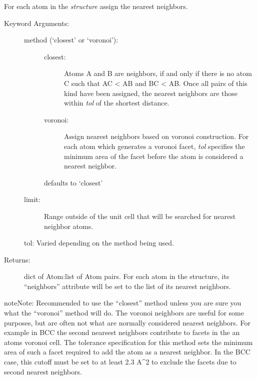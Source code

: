 \documentclass[letterpaper,10pt,english]{sphinxmanual}
\begin{document}
\begin{fulllineitems}
\label{models:qmpy.analysis.nearest_neighbors.find_nearest_neighbors}
For each atom in the \emph{structure} assign the nearest neighbors.
\begin{description}
\item[{Keyword Arguments:}] \leavevmode\begin{description}
\item[{method (`closest' or `voronoi'):}] \leavevmode\begin{description}
\item[{closest: }] \leavevmode
Atoms A and B are neighbors, if and only if there is no atom C 
such that AC \textless{} AB and BC \textless{} AB. Once all pairs of this kind 
have been assigned, the nearest neighbors are those within 
\emph{tol} of the shortest distance.

\item[{voronoi: }] \leavevmode
Assign nearest neighbors based on voronoi construction.
For each atom which generates a voronoi facet, \emph{tol} specifies
the minimum area of the facet before the atom is considered a
nearest neighbor.

\end{description}

defaults to `closest'

\item[{limit:}] \leavevmode
Range outside of the unit cell that will be searched for nearest
neighbor atoms.

\end{description}

tol: Varied depending on the method being used.

\item[{Returns:}] \leavevmode
dict of Atom:list of Atom pairs. For each atom in the structure, its
``neighbors'' attribute will be set to the list of its nearest neighbors.

\end{description}

\begin{notice}{note}{Note:}
Recommended to use the ``closest'' method unless you are sure you
what the ``voronoi'' method will do. The voronoi neighbors are
useful for some purposes, but are often not what are normally
considered nearest neighbors. For example in BCC the second
nearsest neighbors contribute to facets in the an atoms voronoi
cell. The tolerance specification for this method sets the
minimum area of such a facet required to add the atom as a
nearest neighbor. In the BCC case, this cutoff must be set to at
least 2.3 A\textasciicircum{}2 to exclude the facets due to second nearest
neighbors.
\end{notice}

\end{fulllineitems}
\end{document}
